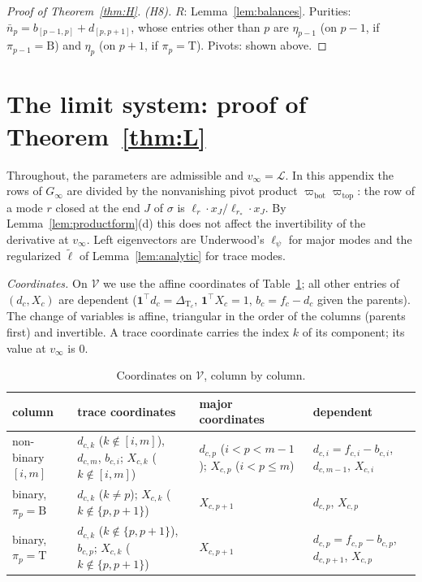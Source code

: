 \documentclass[11pt,a4paper]{report}
\newcommand{\cV}{\mathcal V}
\newcommand{\cL}{\mathcal L}
\newcommand{\one}{\mathbf 1}
\newcommand{\Ts}{\mathrm T}
\newcommand{\Bs}{\mathrm B}
\newcommand{\piv}{\varpi}
\begin{document}
\begin{proof}[Proof of Theorem~\ref{thm:H}]
\emph{(H8).} \(R\): Lemma~\ref{lem:balances}. Purities: \(\bar n_p=b_{[p-1,p]}+d_{[p,p+1]}\), whose entries other than \(p\) are \(\eta_{p-1}\)
(on \(p-1\), if \(\pi_{p-1}=\Bs\)) and \(\eta_p\) (on \(p+1\), if \(\pi_p=\Ts\)). Pivots: shown above.
\end{proof}

\section{The limit system: proof of Theorem~\ref{thm:L}}\label{app:limit}

Throughout, the parameters are admissible and \(v_\infty=\cL\). In this appendix the rows of \(G_\infty\) are divided by the
nonvanishing pivot product \(\piv_{\mathrm{bot}}\piv_{\mathrm{top}}\): the row of a mode \(r\) closed at the end \(J\) of \(\sigma\) is
\(\ell_r\cdot x_J/\ell_{r_*}\cdot x_J\). By Lemma~\ref{lem:productform}(d) this does not affect the invertibility of the derivative at
\(v_\infty\). Left eigenvectors are Underwood's \(\ell_\psi\) for major modes and the regularized \(\tilde\ell\) of
Lemma~\ref{lem:analytic} for trace modes.

\emph{Coordinates.} On \(\cV\) we use the affine coordinates of Table~\ref{tab:coords}; all other entries of \((d_c,X_c)\) are
dependent (\(\one^\top d_c=\Delta_{\Ts_c}\), \(\one^\top X_c=1\), \(b_c=f_c-d_c\) given the parents). The change of variables is affine,
triangular in the order of the columns (parents first) and invertible. A trace coordinate carries the index \(k\) of its
component; its value at \(v_\infty\) is \(0\).

\begin{table}[ht]
\centering\footnotesize\setlength{\tabcolsep}{3pt}
\caption{Coordinates on \(\cV\), column by column.}\label{tab:coords}
\begin{tabular}{@{}>{\raggedright}p{2.0cm}>{\raggedright}p{5.0cm}>{\raggedright}p{3.1cm}>{\raggedright\arraybackslash}p{3.5cm}@{}}
\toprule
column & trace coordinates & major coordinates & dependent\\
\midrule
non-binary \([i,m]\) & \(d_{c,k}\) (\(k\notin[i,m]\)), \(d_{c,m}\), \(b_{c,i}\); \(X_{c,k}\) (\(k\notin[i,m]\)) & \(d_{c,p}\) (\(i<p<m-1\)); \(X_{c,p}\) (\(i<p\le m\)) & \(d_{c,i}=f_{c,i}-b_{c,i}\), \(d_{c,m-1}\), \(X_{c,i}\)\\
binary, \(\pi_p=\Bs\) & \(d_{c,k}\) (\(k\ne p\)); \(X_{c,k}\) (\(k\notin\{p,p+1\}\)) & \(X_{c,p+1}\) & \(d_{c,p}\), \(X_{c,p}\)\\
binary, \(\pi_p=\Ts\) & \(d_{c,k}\) (\(k\notin\{p,p+1\}\)), \(b_{c,p}\); \(X_{c,k}\) (\(k\notin\{p,p+1\}\)) & \(X_{c,p+1}\) & \(d_{c,p}=f_{c,p}-b_{c,p}\), \(d_{c,p+1}\), \(X_{c,p}\)\\
\bottomrule
\end{tabular}
\end{table}
\end{document}
